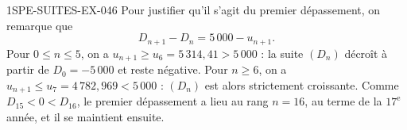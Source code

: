 \begin{corrige}{1SPE-SUITES-EX-046}
Pour justifier qu'il s'agit du premier dépassement, on remarque que
\[
D_{n+1}-D_n=5\,000-u_{n+1}.
\]
Pour $0\leq n\leq5$, on a $u_{n+1}\geq u_6=5\,314{,}41>5\,000$ : la suite $(D_n)$ décroît à partir de $D_0=-5\,000$ et reste négative. Pour $n\geq6$, on a $u_{n+1}\leq u_7=4\,782{,}969<5\,000$ : $(D_n)$ est alors strictement croissante. Comme $D_{15}<0<D_{16}$, le premier dépassement a lieu au rang $n=16$, au terme de la $17^\text{e}$ année, et il se maintient ensuite.


\end{corrige}
